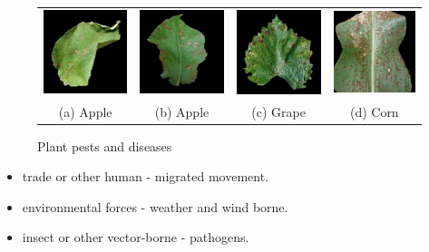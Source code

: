 \begin{figure}[H]
        \centering
        \begin{tabular}{cccc}
            \includegraphics[width=3.2cm]{photos/chapter01/1.jpg}   & \includegraphics[width=3.2cm]{photos/chapter01/2.jpg}
            & \includegraphics[width=3.2cm]{photos/chapter01/3.jpg} & \includegraphics[width=3.2cm]{photos/chapter01/4.jpg} \\
            (a) Apple & (b) Apple & (c) Grape & (d) Corn \\[6pt]
        \end{tabular}
        \caption{Plant pests and diseases}
\end{figure}

\noindent
{}
\begin{itemize}
    \item trade or other human - migrated movement.
    \item environmental forces - weather and wind borne.
    \item insect or other vector-borne - pathogens.
\end{itemize}


